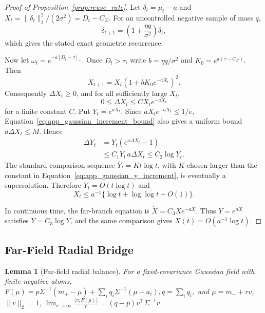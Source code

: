 \documentclass{article}
\theoremstyle{plain}
\newtheorem{lemma}[theorem]{Lemma}
\theoremstyle{definition}
\theoremstyle{remark}
\begin{document}
\begin{proof}[Proof of Proposition~\ref{prop:reuse_rate}]
Let \(\delta_t=\mu_t-a\) and
\(X_t=\|\delta_t\|_2^2/(2\sigma^2)=D_t-C_\Sigma\).
For an uncontrolled negative sample of mass \(q\),
\[
\delta_{t+1}
=\left(1+\frac{\eta q}{\sigma^2}\right)\delta_t,
\]
which gives the stated exact geometric recurrence.

Now let \(\omega_t=e^{-a[D_t-\tau]_+}\). Once
\(D_t>\tau\), write
\(b=\eta q/\sigma^2\) and
\(K_0=e^{a(\tau-C_\Sigma)}\). Then
\begin{equation}
X_{t+1}=X_t\left(1+bK_0e^{-aX_t}\right)^2.
\label{eq:app_tapered_gaussian_recurrence}
\end{equation}
Consequently \(\Delta X_t\ge0\), and for all sufficiently large
\(X_t\),
\begin{equation}
0\le\Delta X_t\le C X_te^{-aX_t}
\label{eq:app_gaussian_increment_bound}
\end{equation}
for a finite constant \(C\). Put \(Y_t=e^{aX_t}\). Since
\(aX_te^{-aX_t}\le1/e\),
Equation~\eqref{eq:app_gaussian_increment_bound} also gives a uniform
bound \(a\Delta X_t\le M\). Hence
\begin{align}
\Delta Y_t
&=Y_t(e^{a\Delta X_t}-1) \\
&\le C_1Y_t\,a\Delta X_t
\le C_2\log Y_t.
\label{eq:app_gaussian_y_increment}
\end{align}
The standard comparison sequence
\(\overline Y_t=K t\log t\), with \(K\) chosen larger than the
constant in Equation~\eqref{eq:app_gaussian_y_increment}, is eventually
a supersolution. Therefore
\(Y_t=O(t\log t)\) and
\[
X_t\le a^{-1}\{\log t+\log\log t+O(1)\}.
\]

In continuous time, the far-branch equation is
\(\dot X=C_3Xe^{-aX}\). Thus
\(Y=e^{aX}\) satisfies \(\dot Y=C_3\log Y\), and the same comparison
gives \(X(t)=O(a^{-1}\log t)\).
\end{proof}

\subsection{Far-Field Radial Bridge}
\label{app:far_field_bridge}

\begin{lemma}[Far-field radial balance]
\label{lem:far_field_radial_balance}
For a fixed-covariance Gaussian field with finite negative atoms,
\(
F(\mu)=p\Sigma^{-1}(m_+-\mu)
 +\sum_iq_i\Sigma^{-1}(\mu-a_i),
q=\sum_iq_i,
\)
and \(\mu=m_++rv\), \(\|v\|_2=1\),
\(
\lim_{r\to\infty}\frac{\langle v,F(\mu)\rangle}{r}
=(q-p)v^\top\Sigma^{-1}v.
\)
\end{lemma}
\end{document}
